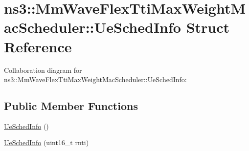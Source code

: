\hypertarget{structns3_1_1MmWaveFlexTtiMaxWeightMacScheduler_1_1UeSchedInfo}{}\section{ns3\+:\+:Mm\+Wave\+Flex\+Tti\+Max\+Weight\+Mac\+Scheduler\+:\+:Ue\+Sched\+Info Struct Reference}
\label{structns3_1_1MmWaveFlexTtiMaxWeightMacScheduler_1_1UeSchedInfo}


Collaboration diagram for ns3\+:\+:Mm\+Wave\+Flex\+Tti\+Max\+Weight\+Mac\+Scheduler\+:\+:Ue\+Sched\+Info\+:
\subsection*{Public Member Functions}
\begin{DoxyCompactItemize}
\item 
\hyperlink{structns3_1_1MmWaveFlexTtiMaxWeightMacScheduler_1_1UeSchedInfo_aeaec15b97d8497d3ab49b8b1297e2835}{Ue\+Sched\+Info} ()
\item 
\hyperlink{structns3_1_1MmWaveFlexTtiMaxWeightMacScheduler_1_1UeSchedInfo_a7cd0d416dc68456ad6ced179144093b3}{Ue\+Sched\+Info} (uint16\+\_\+t rnti)
\end{DoxyCompactItemize}
